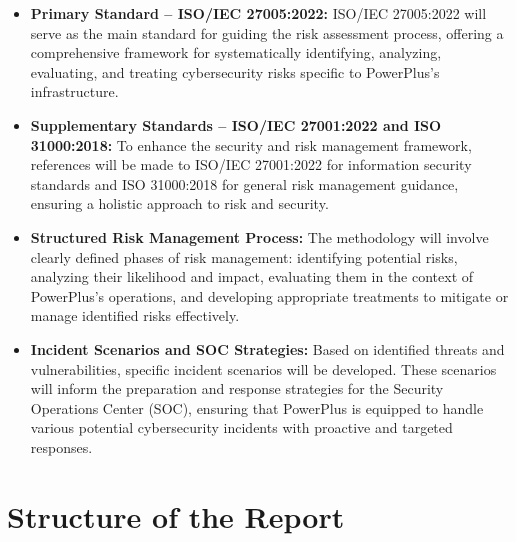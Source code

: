 \begin{itemize}
    \item \textbf{Primary Standard – ISO/IEC 27005:2022:} ISO/IEC 27005:2022 will serve as the main standard for guiding the risk assessment process, offering a comprehensive framework for systematically identifying, analyzing, evaluating, and treating cybersecurity risks specific to PowerPlus’s infrastructure.
    \item \textbf{Supplementary Standards – ISO/IEC 27001:2022 and ISO 31000:2018:} To enhance the security and risk management framework, references will be made to ISO/IEC 27001:2022 for information security standards and ISO 31000:2018 for general risk management guidance, ensuring a holistic approach to risk and security.
    \item \textbf{Structured Risk Management Process:} The methodology will involve clearly defined phases of risk management: identifying potential risks, analyzing their likelihood and impact, evaluating them in the context of PowerPlus’s operations, and developing appropriate treatments to mitigate or manage identified risks effectively.
    \item \textbf{Incident Scenarios and SOC Strategies:} Based on identified threats and vulnerabilities, specific incident scenarios will be developed. These scenarios will inform the preparation and response strategies for the Security Operations Center (SOC), ensuring that PowerPlus is equipped to handle various potential cybersecurity incidents with proactive and targeted responses.
\end{itemize}

\section{Structure of the Report}


